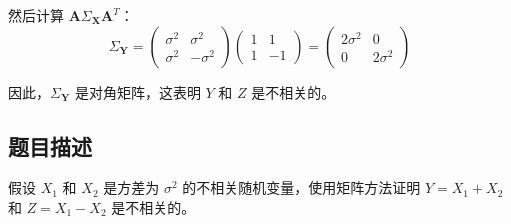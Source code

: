 \documentclass[UTF8]{report}
\theoremstyle{MyLineTheoremStyle} %
\theoremstyle{MyBlockTheoremStyle} %
\theoremstyle{MySubsubsectionStyle} %
\begin{document}
然后计算 $\mathbf{A} \Sigma_{\mathbf{X}} \mathbf{A}^T$：
\[
\Sigma_{\mathbf{Y}} = \begin{pmatrix} \sigma^2 & \sigma^2 \\ \sigma^2 & -\sigma^2 \end{pmatrix} \begin{pmatrix} 1 & 1 \\ 1 & -1 \end{pmatrix} = \begin{pmatrix} 2\sigma^2 & 0 \\ 0 & 2\sigma^2 \end{pmatrix}
\]

因此，$\Sigma_{\mathbf{Y}}$ 是对角矩阵，这表明 $Y$ 和 $Z$ 是不相关的。




\subsection*{题目描述}
假设 $X_1$ 和 $X_2$ 是方差为 $\sigma^2$ 的不相关随机变量，使用矩阵方法证明 $Y = X_1 + X_2$ 和 $Z = X_1 - X_2$ 是不相关的。
\end{document}
